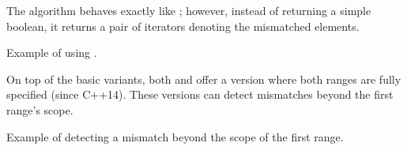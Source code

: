The  algorithm behaves exactly like ; however, instead of returning a simple boolean, it returns a pair of iterators denoting the mismatched elements.


\begin{codebox}[]{\href{https://compiler-explorer.com/z/cY4Eo3MYv}{\ExternalLink}}
\footnotesize Example of using .
\tcblower
{}
\end{codebox}

On top of the basic variants, both  and  offer a version where both ranges are fully specified (since C++14). These versions can detect mismatches beyond the first range's scope.


\begin{codebox}[]{\href{https://compiler-explorer.com/z/f93PY3fPM}{\ExternalLink}}
\footnotesize Example of detecting a mismatch beyond the scope of the first range.
\tcblower
{}
\end{codebox}